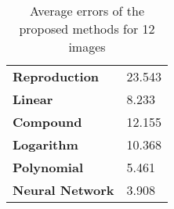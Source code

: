 \begin{table}[H]
  \caption{Average errors of the proposed methods for 12 images }
      \begin{tabularx}{\textwidth}{C C}
    \toprule
        \textbf{Reproduction} & 23.543\\ 
        \textbf{Linear} & 8.233\\ 
        \textbf{Compound} & 12.155\\ 
        \textbf{Logarithm} & 10.368\\ 
        \textbf{Polynomial} & 5.461\\ 
        \textbf{Neural Network} & 3.908\\ 
    \bottomrule
    \end{tabularx}
\end{table}

